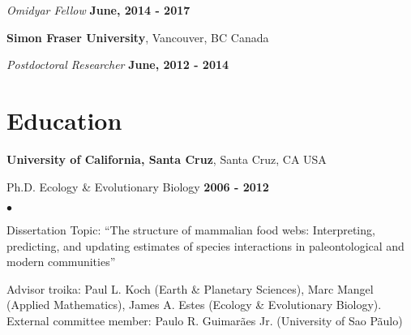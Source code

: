 \documentclass[margin,line,12pt]{res}
\newenvironment{list1}{
  \begin{list}{\ding{113}}{%
      \setlength{\itemsep}{0in}
      \setlength{\parsep}{0in} \setlength{\parskip}{0in}
      \setlength{\topsep}{0in} \setlength{\partopsep}{0in}
      \setlength{\leftmargin}{0.17in}}}{\end{list}}
\newenvironment{list2}{
  \begin{list}{$\bullet$}{%
      \setlength{\itemsep}{0in}
      \setlength{\parsep}{0in} \setlength{\parskip}{0in}
      \setlength{\topsep}{0in} \setlength{\partopsep}{0in}
      \setlength{\leftmargin}{0.2in}}}{\end{list}}
\begin{document}
\begin{resume}
\vspace{-.3cm}
{\em Omidyar Fellow} \hfill {\bf June, 2014 - 2017}\\
\vspace{-.3cm}

{\bf Simon Fraser University}, Vancouver, BC Canada

\vspace{-.3cm}
{\em Postdoctoral Researcher} \hfill {\bf June, 2012 - 2014}\\


\section{\sc Education}
{\bf University of California, Santa Cruz}, Santa Cruz, CA USA\\
\vspace*{-.1in}
\begin{list1}
\item[] Ph.D. Ecology \& Evolutionary Biology \hfill {\bf 2006 - 2012}\\
\begin{list2}
\vspace*{-.08in}
\item Dissertation Topic: ``The structure of mammalian food webs: Interpreting, predicting, and updating estimates of species interactions in paleontological and modern communities''
\item Advisor troika: Paul L. Koch (Earth \& Planetary Sciences), Marc Mangel (Applied Mathematics), James A. Estes (Ecology \& Evolutionary Biology).\\ External committee member: Paulo R. Guimar\~aes Jr. (University of Sao P\~aulo)
\end{list2}
\end{list1}



\end{resume}
\end{document}
